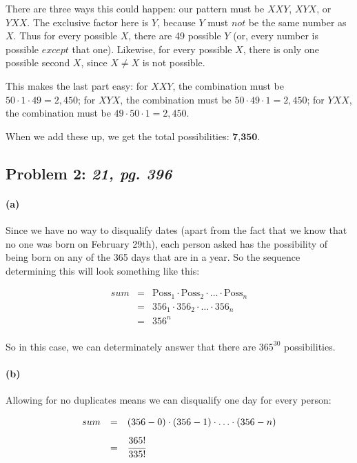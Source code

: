\documentclass[a4paper]{article}
\begin{document}
There are three ways this could happen: our pattern must be $XXY$, $XYX$, or $YXX$. The exclusive factor here is $Y$, because $Y$ must $\textit{not}$ be the same number as $X$. Thus for every possible $X$, there are 49 possible $Y$ (or, every number is possible $\textit{except}$ that one). Likewise, for every possible $X$, there is only one possible second $X$, since $X \ne X$ is not possible.

This makes the last part easy: for $XXY$, the combination must be $50 \cdot 1 \cdot 49 = 2,450$; for $XYX$, the combination must be $50 \cdot 49 \cdot 1 = 2,450$; for $YXX$, the combination must be $49 \cdot 50 \cdot 1 = 2,450$.

When we add these up, we get the total possibilities: $\textbf{7,350}$.

\subsection*{Problem 2: \textit{21, pg. 396}}

\paragraph{(a)} Since we have no way to disqualify dates (apart from the fact that we know that no one was born on February 29th), each person asked has the possibility of being born on any of the 365 days that are in a year. So the sequence determining this will look something like this:

\begin{equation}
\begin{array}{rll}
sum & = & \mbox{Poss}_1 \cdot \mbox{Poss}_2 \cdot \ldots \cdot \mbox{Poss}_n \\
& = & 356_1 \cdot 356_2 \cdot \ldots \cdot 356_n \\
& = & 356^n \\
\end{array}
\end{equation}	

So in this case, we can determinately answer that there are $365^{30}$ possibilities.

\paragraph{(b)} Allowing for no duplicates means we can disqualify one day for every person:

\begin{equation}
\begin{array}{rll}
sum & = & (356-0) \cdot (356-1) \cdot \ldots \cdot (356-n) \\[.1in]
& = & \cfrac{365!}{335!} \\
\end{array}
\end{equation}	
\end{document}
